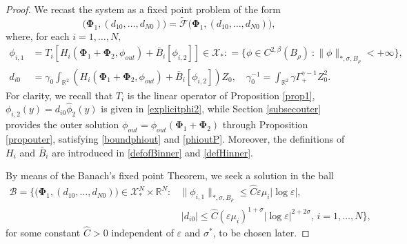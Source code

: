 \documentclass[11pt,reqno,a4paper]{amsart}
\numberwithin{equation}{section}
\newcommand{\R}{\mathbb{R}}
\newcommand{\defeq}{\mathrel{\mathop:}=}
\newcommand{\ve}{\varepsilon}
\begin{document}
\begin{proof}
We recast the system as a fixed point problem of the form\begin{equation}\label{fixedfinal}
\big(\mathbf{\Phi}_1,(d_{10},\dots,d_{N0})\big) =\widetilde{\mathcal{F}}\big(\mathbf{\Phi}_1,(d_{10},\dots,d_{N0})\big),
\end{equation}
where, for each $i=1,\dots,N,$ 
\begin{equation*}
\begin{aligned}
\phi_{i,1}&=T_i\left[H_i(\mathbf{\Phi}_1+\mathbf{\Phi}_2,\phi_{out})+\bar{B}_{i}[\phi_{i,2}]\right]\in \mathcal{X}_{*}\defeq\{\phi \in C^{2,\beta}(B_{\rho})\ : 
  \|\phi\|_{*, \sigma,B_{\rho}} <+\infty\},\\
d_{i0}&=\gamma_0\int_{\R^2} \left(H_i(\mathbf{\Phi}_1+\mathbf{\Phi}_2,\phi_{out})+\bar{B}_i[\phi_{i,2}]\right)Z_0, \quad \gamma_0^{-1}=\int_{\R^2}\gamma\Gamma^{\gamma-1}_{+}Z_0^2.
\end{aligned}
\end{equation*}
For clarity, we recall that $T_i$ is the linear operator of Proposition \ref{prop1}, \,$\phi_{i,2}(y)=d_{i0}\hat{\phi}_{2}(y)$ is given in \eqref{explicitphi2}, while Section \ref{subsecouter} provides the outer solution $\phi_{out}=\phi_{out}(\mathbf{\Phi}_1+\mathbf{\Phi}_2)$ through Proposition \ref{propouter}, satisfying \eqref{boundphiout} and \eqref{phioutP}. Moreover, the definitions of $H_i$ and $\bar{B}_i$ are introduced in \eqref{defofBinner} and \eqref{defHinner}.

By means of the Banach's fixed point Theorem, we seek a solution in the ball 
\begin{equation}\label{contractionball}
\begin{aligned}
\mathcal{B}=\Big\{\big(\mathbf{\Phi}_1,\left(d_{10},\dots,d_{N0}\right)\big)\in \mathcal{X}^{N}_{*}\times \R^{N}: &\|\phi_{i,1}\|_{*,\sigma,B_\rho}\leq \widehat{C}\ve\mu_i|\log\ve|,\\ &\,|d_{i0}|\leq \widehat{C}(\ve\mu_i)^{1+\sigma}|\log\ve|^{2+2\sigma},\,i=1,\dots,N\Big\},
\end{aligned}
\end{equation}
for some constant $\widehat{C}>0$ independent of $\ve$ and $\sigma^{*}$, to be chosen later.


\end{proof}
\end{document}
